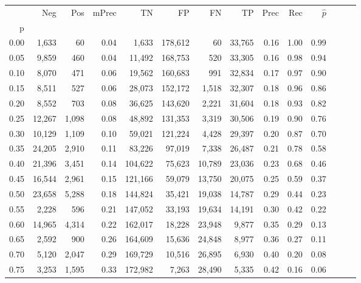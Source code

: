 \begin{tabular}{rrrrrrrrrrrrrr}
\toprule
{} &     Neg &    Pos & mPrec &       TN &       FP &      FN &      TP &  Prec &   Rec & $\hat{p}$ \\
p    &         &        &       &          &          &         &         &       &       &           \\
\midrule
0.00 &   1,633 &     60 &  0.04 &    1,633 &  178,612 &      60 &  33,765 &  0.16 &  1.00 &      0.99 \\
0.05 &   9,859 &    460 &  0.04 &   11,492 &  168,753 &     520 &  33,305 &  0.16 &  0.98 &      0.94 \\
0.10 &   8,070 &    471 &  0.06 &   19,562 &  160,683 &     991 &  32,834 &  0.17 &  0.97 &      0.90 \\
0.15 &   8,511 &    527 &  0.06 &   28,073 &  152,172 &   1,518 &  32,307 &  0.18 &  0.96 &      0.86 \\
0.20 &   8,552 &    703 &  0.08 &   36,625 &  143,620 &   2,221 &  31,604 &  0.18 &  0.93 &      0.82 \\
0.25 &  12,267 &  1,098 &  0.08 &   48,892 &  131,353 &   3,319 &  30,506 &  0.19 &  0.90 &      0.76 \\
0.30 &  10,129 &  1,109 &  0.10 &   59,021 &  121,224 &   4,428 &  29,397 &  0.20 &  0.87 &      0.70 \\
0.35 &  24,205 &  2,910 &  0.11 &   83,226 &   97,019 &   7,338 &  26,487 &  0.21 &  0.78 &      0.58 \\
0.40 &  21,396 &  3,451 &  0.14 &  104,622 &   75,623 &  10,789 &  23,036 &  0.23 &  0.68 &      0.46 \\
0.45 &  16,544 &  2,961 &  0.15 &  121,166 &   59,079 &  13,750 &  20,075 &  0.25 &  0.59 &      0.37 \\
0.50 &  23,658 &  5,288 &  0.18 &  144,824 &   35,421 &  19,038 &  14,787 &  0.29 &  0.44 &      0.23 \\
0.55 &   2,228 &    596 &  0.21 &  147,052 &   33,193 &  19,634 &  14,191 &  0.30 &  0.42 &      0.22 \\
0.60 &  14,965 &  4,314 &  0.22 &  162,017 &   18,228 &  23,948 &   9,877 &  0.35 &  0.29 &      0.13 \\
0.65 &   2,592 &    900 &  0.26 &  164,609 &   15,636 &  24,848 &   8,977 &  0.36 &  0.27 &      0.11 \\
0.70 &   5,120 &  2,047 &  0.29 &  169,729 &   10,516 &  26,895 &   6,930 &  0.40 &  0.20 &      0.08 \\
0.75 &   3,253 &  1,595 &  0.33 &  172,982 &    7,263 &  28,490 &   5,335 &  0.42 &  0.16 &      0.06 \\

\end{tabular}

